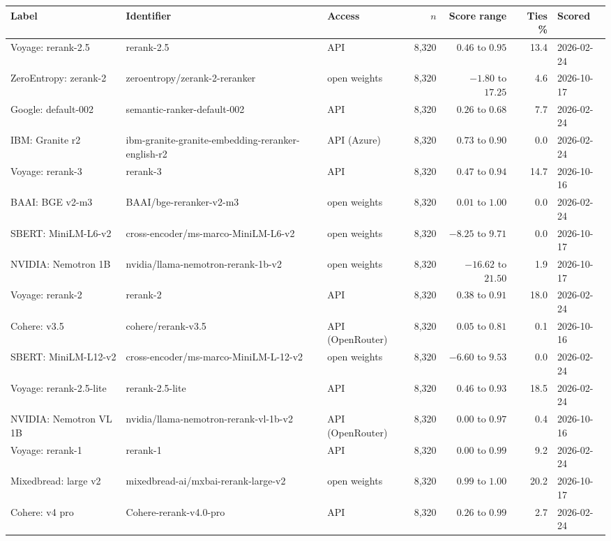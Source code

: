 \begin{tabular}{lllrrrl}
\toprule
Label & Identifier & Access & $n$ & Score range & Ties \% & Scored \\
\midrule
Voyage: rerank-2.5 & rerank-2.5 & API & 8,320 & $0.46$ to $0.95$ & 13.4 & 2026-02-24 \\
ZeroEntropy: zerank-2 & zeroentropy/zerank-2-reranker & open weights & 8,320 & $-1.80$ to $17.25$ & 4.6 & 2026-10-17 \\
Google: default-002 & semantic-ranker-default-002 & API & 8,320 & $0.26$ to $0.68$ & 7.7 & 2026-02-24 \\
IBM: Granite r2 & ibm-granite-granite-embedding-reranker-english-r2 & API (Azure) & 8,320 & $0.73$ to $0.90$ & 0.0 & 2026-02-24 \\
Voyage: rerank-3 & rerank-3 & API & 8,320 & $0.47$ to $0.94$ & 14.7 & 2026-10-16 \\
BAAI: BGE v2-m3 & BAAI/bge-reranker-v2-m3 & open weights & 8,320 & $0.01$ to $1.00$ & 0.0 & 2026-02-24 \\
SBERT: MiniLM-L6-v2 & cross-encoder/ms-marco-MiniLM-L6-v2 & open weights & 8,320 & $-8.25$ to $9.71$ & 0.0 & 2026-10-17 \\
NVIDIA: Nemotron 1B & nvidia/llama-nemotron-rerank-1b-v2 & open weights & 8,320 & $-16.62$ to $21.50$ & 1.9 & 2026-10-17 \\
Voyage: rerank-2 & rerank-2 & API & 8,320 & $0.38$ to $0.91$ & 18.0 & 2026-02-24 \\
Cohere: v3.5 & cohere/rerank-v3.5 & API (OpenRouter) & 8,320 & $0.05$ to $0.81$ & 0.1 & 2026-10-16 \\
SBERT: MiniLM-L12-v2 & cross-encoder/ms-marco-MiniLM-L-12-v2 & open weights & 8,320 & $-6.60$ to $9.53$ & 0.0 & 2026-02-24 \\
Voyage: rerank-2.5-lite & rerank-2.5-lite & API & 8,320 & $0.46$ to $0.93$ & 18.5 & 2026-02-24 \\
NVIDIA: Nemotron VL 1B & nvidia/llama-nemotron-rerank-vl-1b-v2 & API (OpenRouter) & 8,320 & $0.00$ to $0.97$ & 0.4 & 2026-10-16 \\
Voyage: rerank-1 & rerank-1 & API & 8,320 & $0.00$ to $0.99$ & 9.2 & 2026-02-24 \\
Mixedbread: large v2 & mixedbread-ai/mxbai-rerank-large-v2 & open weights & 8,320 & $0.99$ to $1.00$ & 20.2 & 2026-10-17 \\
Cohere: v4 pro & Cohere-rerank-v4.0-pro & API & 8,320 & $0.26$ to $0.99$ & 2.7 & 2026-02-24 \\

\end{tabular}
